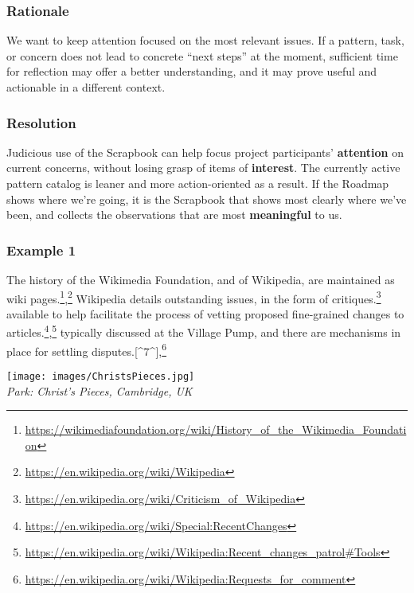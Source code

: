 \hypertarget{rationale}{%
\subsubsection{Rationale}\label{rationale}}

We want to keep attention focused on the most relevant issues. If a
pattern, task, or concern does not lead to concrete ``next steps'' at
the moment, sufficient time for reflection may offer a better
understanding, and it may prove useful and actionable in a different
context.

\hypertarget{resolution}{%
\subsubsection{Resolution}\label{resolution}}

Judicious use of the {{Scrapbook}} can help focus project participants'
\textbf{attention} on current concerns, without losing grasp of items of
\textbf{interest}. The currently active pattern catalog is leaner and
more action-oriented as a result. If the {{Roadmap}} shows where we're
going, it is the {{Scrapbook}} that shows most clearly where we've been,
and collects the observations that are most \textbf{meaningful} to us.

\hypertarget{example-1}{%
\subsubsection{Example 1}\label{example-1}}

The history of the Wikimedia Foundation, and of Wikipedia, are
maintained as wiki pages.\footnote{\url{https://wikimediafoundation.org/wiki/History_of_the_Wikimedia_Foundation}},\footnote{\url{https://en.wikipedia.org/wiki/Wikipedia}}
Wikipedia details outstanding issues, in the form of
critiques.\footnote{\url{https://en.wikipedia.org/wiki/Criticism_of_Wikipedia}}
available to help facilitate the process of vetting proposed
fine-grained changes to articles.\footnote{\url{https://en.wikipedia.org/wiki/Special:RecentChanges}},\footnote{\url{https://en.wikipedia.org/wiki/Wikipedia:Recent_changes_patrol\#Tools}}
typically discussed at the Village Pump, and there are mechanisms in
place for settling disputes.{[}\^{}7\^{}{]},\footnote{\url{https://en.wikipedia.org/wiki/Wikipedia:Requests_for_comment}}

\texttt{[image: images/ChristsPieces.jpg]}\\
\emph{Park: Christ's Pieces, Cambridge, UK}

